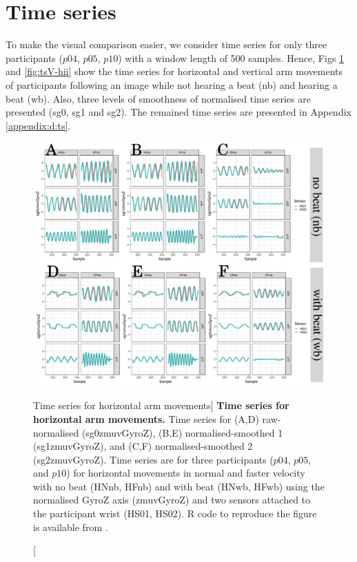 \section{Time series}
To make the visual comparison easier, we consider time series for only three 
participants ($p04$, $p05$, $p10$) with a window length of 500 samples.
Hence, Figs \ref{fig:tsH-hii} and \ref{fig:tsV-hii} show the 
time series for horizontal and vertical arm movements of participants 
following an image while not hearing a beat (nb) and hearing a beat (wb).
Also, three levels of smoothness of normalised time series are presented
 (sg0, sg1 and sg2).
The remained time series are presented in Appendix \ref{appendix:d:ts}.
\begin{figure}
\centering
\includegraphics[width=1.0\textwidth]{tsH}
    	\caption
	[Time series for horizontal arm movements]{
	{\bf Time series for horizontal arm movements.}
		Time series for (A,D) raw-normalised (sg0zmuvGyroZ), 
		(B,E) normalised-smoothed 1 (sg1zmuvGyroZ), and
		(C,F) normalised-smoothed 2 (sg2zmuvGyroZ).
		Time series are for three participants 
		($p04$, $p05$, and $p10$) 
		for horizontal movements in normal and faster velocity with
		no beat	(HNnb, HFnb) and with beat (HNwb, HFwb) using 
		the normalised GyroZ axis (zmuvGyroZ) and 
		two sensors attached to the participant wrist (HS01, HS02).
	R code to reproduce the figure is available from \cite{hwum2018}.
        }
    \label{fig:tsH-hii}
\end{figure}
